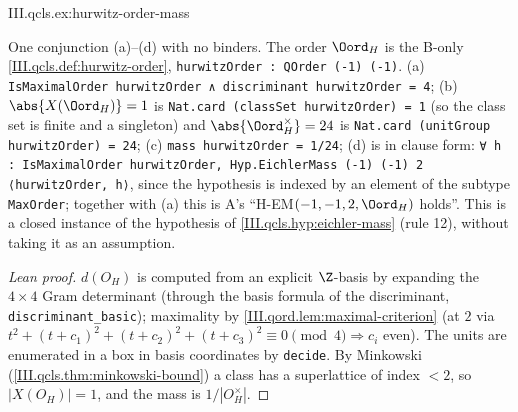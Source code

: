 \begin{example}
\end{example}
\begin{tfformal}{III.qcls.ex:hurwitz-order-mass}
\begin{tffidelity}
One conjunction (a)--(d) with no binders. The order $\Oord_H$ is the B-only \cref{III.qcls.def:hurwitz-order}, \texttt{hurwitzOrder : QOrder (-1) (-1)}. (a) \texttt{IsMaximalOrder hurwitzOrder ∧ discriminant hurwitzOrder = 4}; (b) $\abs{X(\Oord_H)}=1$ is \texttt{Nat.card (classSet hurwitzOrder) = 1} (so the class set is finite and a singleton) and $\abs{\Oord_H^\times}=24$ is \texttt{Nat.card (unitGroup hurwitzOrder) = 24}; (c) \texttt{mass hurwitzOrder = 1/24}; (d) is in clause form: \texttt{∀ h : IsMaximalOrder hurwitzOrder, Hyp.EichlerMass (-1) (-1) 2 ⟨hurwitzOrder, h⟩}, since the hypothesis is indexed by an element of the subtype \texttt{MaxOrder}; together with (a) this is A's ``H-EM$(-1,-1,2,\Oord_H)$ holds''. This is a closed instance of the hypothesis of \cref{III.qcls.hyp:eichler-mass} (rule 12), without taking it as an assumption.
\end{tffidelity}
\end{tfformal}
\begin{proof}[Lean proof]
$d(O_H)$ is computed from an explicit $\Z$-basis by expanding the $4\times4$ Gram determinant (through the basis formula of the discriminant, \texttt{discriminant\_basic}); maximality by \cref{III.qord.lem:maximal-criterion} (at $2$ via $t^2+(t+c_1)^2+(t+c_2)^2+(t+c_3)^2\equiv0\pmod 4\Rightarrow c_i$ even). The units are enumerated in a box in basis coordinates by \texttt{decide}. By Minkowski (\cref{III.qcls.thm:minkowski-bound}) a class has a superlattice of index $<2$, so $|X(O_H)|=1$, and the mass is $1/|O_H^\times|$.
\end{proof}

